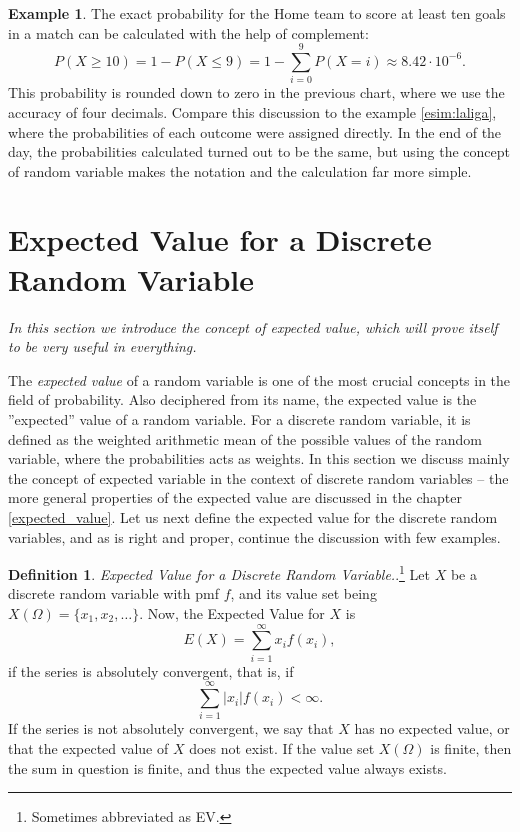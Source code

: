 \documentclass[12pt,a4paper,leqno]{report}
\theoremstyle{plain}
\theoremstyle{definition}
\newtheorem{maar}[equation]{Definition}
\newtheorem{esim}[equation]{Example}
\begin{document}
\begin{esim}
\bigskip

The exact probability for the Home team to score at least ten goals in a match can be calculated with the help of complement:
\[
P(X \geq 10) = 1 - P(X \leq 9) = 1 - \sum_{i=0}^9 P(X = i) \approx 8.42 \cdot 10^{-6}.
\]
This probability is rounded down to zero in the previous chart, where we use the accuracy of four decimals. Compare this discussion to the example \ref{esim:laliga}, where the probabilities of each outcome were assigned directly. In the end of the day, the probabilities calculated turned out to be the same, but using the concept of random variable makes the notation and the calculation far more simple.
\end{esim}

\section{Expected Value for a Discrete Random Variable}

\emph{In this section we introduce the concept of expected value, which will prove itself to be very useful in everything.}

The \emph{expected value} of a random variable is one of the most crucial concepts in the field of probability. Also deciphered from its name, the expected value is the ''expected'' value of a random variable. For a discrete random variable, it is defined as the weighted arithmetic mean of the possible values of the random variable, where the probabilities acts as weights. In this section we discuss mainly the concept of expected variable in the context of discrete random variables -- the more general properties of the expected value are discussed in the chapter \ref{expected_value}. Let us next define the expected value for the discrete random variables, and as is right and proper, continue the discussion with few examples.

\begin{maar}\label{maar:discrete_expected_value}
\emph{Expected Value for a Discrete Random Variable.}.\footnote{Sometimes abbreviated as EV.} Let $X$ be a discrete random variable with pmf $f$, and its value set being $X(\Omega) = \{x_1, x_2, \dots\}$. Now, the Expected Value for $X$ is
\[
E(X) = \sum_{i=1}^\infty x_i f(x_i),
\]
if the series is absolutely convergent, that is, if
\[
\sum_{i=1}^\infty |x_i| f(x_i) < \infty.
\]
If the series is not absolutely convergent, we say that $X$ has no expected value, or that the expected value of $X$ does not exist. If the value set $X(\Omega)$ is finite, then the sum in question is finite, and thus the expected value always exists.
\end{maar}
\end{document}
